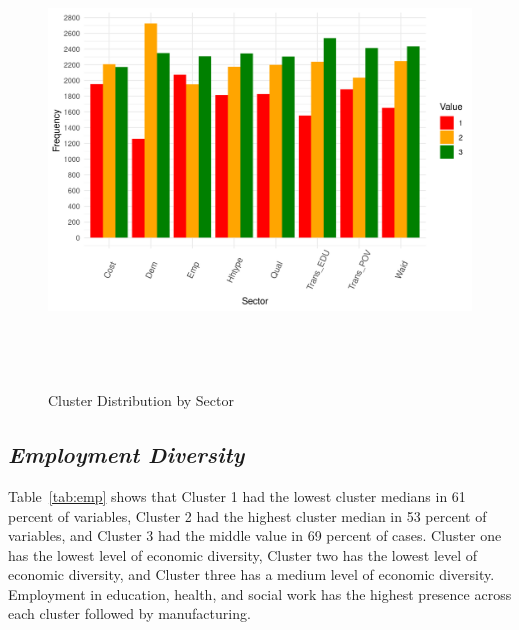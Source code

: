 \begin{figure}[htbp]
    \centering
     \includegraphics[width=1\textwidth, height=12cm]{plots/cluster_distribution.png}
     \caption{Cluster Distribution by Sector}
     \label{fig:cluster_dis}
 \end{figure}

\subsection{\textit{Employment Diversity}}

Table~\ref{tab:emp} shows that Cluster 1 had the lowest cluster medians in 61 percent of variables, Cluster 2 had the highest cluster median in 53 percent of variables, and Cluster 3 had the middle value in 69 %
percent of cases. Cluster one has the lowest level of economic diversity, Cluster two has the lowest level of economic diversity, and Cluster three has a medium level of economic diversity. Employment in education, health, and social work has the highest presence across each cluster followed by manufacturing. 





